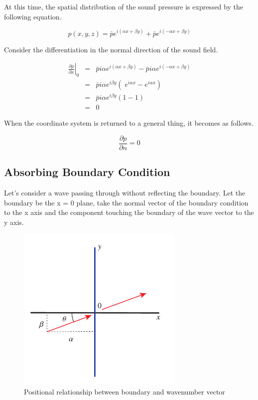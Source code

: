 At this time, the spatial distribution of the sound pressure is expressed by the following equation.

\begin{equation}
p(x,y,z)=\bar{p}e^{i(\alpha x+\beta y)} + \bar{p} e^{i(-\alpha x+\beta y)}
\end{equation}

Consider the differentiation in the normal direction of the sound field.

\begin{eqnarray}
\left.\frac{\partial p}{\partial x}\right|_0
&=& \bar{p}i\alpha e^{i(\alpha x+\beta y)} - \bar{p}i\alpha e^{i(-\alpha x+\beta y)}\\
&=& \bar{p}i\alpha e^{i\beta y}\left(\;e^{i\alpha x} - e^{i\alpha x}\right)\\
&=& \bar{p}i\alpha e^{i\beta y}\left(1-1\right) \\
&=& 0
\end{eqnarray}

When the coordinate system is returned to a general thing, it becomes as follows.

\begin{tcolorbox}[title=boundary condition (total reflection)]
\begin{equation}
\frac{\partial p}{\partial n}= 0
\end{equation}
\end{tcolorbox}







\subsection{Absorbing Boundary Condition}
Let's consider a wave passing through without reflecting the boundary. Let the boundary be the x = 0 plane, take the normal vector of the boundary condition to the x axis and the component touching the boundary of the wave vector to the y axis.


\begin{figure}
\center
\includegraphics[width=80mm]{images/abc_boundary.pdf}
\caption{Positional relationship between boundary and wavenumber vector}
\end{figure}




